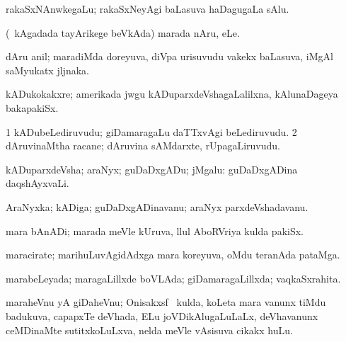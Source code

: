 {{{{{{{\bentry
{} 
\gl{\nA}
\expl{}
\bmng
rakaSxNAnwkegaLu; rakaSxNeyAgi baLasuva haDagugaLa sAlu. 
\emng
\eentry

\bentry
{} 
\gl{\nA}
\expl{}
\bmng
(\kanmu\ kAgadada tayArikege beVkAda) marada nAru, eLe. 
\emng
\eentry

\bentry
{} 
\gl{\nA}
\expl{}
\bmng
dAru anil; maradiMda doreyuva, diVpa urisuvudu \mo vakekx baLasuva, iMgAl saMyukatx jljnaka. 
\emng
\eentry

\bentry
{} 
\gl{\nA}
\expl{}
\bmng
{} 
\emng
\eentry

\bentry
{} 
\gl{\nA}
\expl{}
\bmng
{} 
\emng
\eentry

\bentry
{} 
\gl{\nA}
\expl{}
\bmng
kADukokakxre; amerikada jwgu kADuparxdeVshagaLalilxna, kAlunaDageya bakapakiSx. 
\emng
\eentry

\bentry
{} 
\gl{\nA}
\expl{}
\bmng
\bnum
\num{1} kADubeLediruvudu; giDamaragaLu daTTxvAgi beLediruvudu. 
\num{2} dAruvinaMtha racane; dAruvina sAMdarxte, rUpagaLiruvudu. 
\enum
\emng
\eentry

\bentry
{} 
\gl{\nA}
\expl{}
\bmng
kADuparxdeVsha; araNyx; guDaDxgADu; jMgalu:  guDaDxgADina daqshAyxvaLi. 
\emng
\eentry

\bentry
{} 
\gl{\nA}
\expl{}
\bmng
AraNyxka; kADiga; guDaDxgADinavanu; araNyx parxdeVshadavanu. 
\emng
\eentry

\bentry
{} 
\gl{\nA}
\expl{}
\bmng
mara bAnADi; marada meVle kUruva, llul AboRVriya kulda pakiSx. 
\emng
\eentry

\bentry
{} 
\gl{\nA}
\expl{}
\bmng
maracirate; marihuLuvAgidAdxga mara koreyuva, oMdu teranAda pataMga. 
\emng
\eentry

\bentry
{} 
\gl{\gu}
\expl{}
\bmng
marabeLeyada; maragaLillxde boVLAda; giDamaragaLillxda; vaqkaSxrahita. 
\emng
\eentry

\bentry
{} 
\gl{\nA}
\bmng
maraheVnu yA giDaheVnu; Onisakxsf \mo\ kulda, koLeta mara \mo vanunx tiMdu badukuva, capapxTe deVhada, ELu joVDikAlugaLuLaLx, deVhavanunx ceMDinaMte sutitxkoLuLxva, nelda meVle vAsisuva cikakx huLu. 
\emng
\eentry

}}}}}}}
